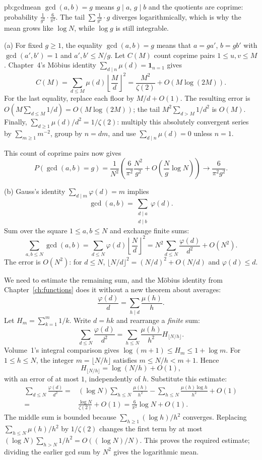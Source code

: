 \begin{solution}{pb:gcdmean}
\idea $\gcd(a,b)=g$ means $g\mid a$, $g\mid b$ and the quotients are coprime: probability $\frac1{g^2}\cdot\frac6{\pi^2}$. The tail
$\sum\frac1{g^2}\cdot g$ diverges logarithmically, which is why the mean grows like $\log N$, while $\log g$ is still integrable.

\writeup (a) For fixed $g\ge1$, the equality $\gcd(a,b)=g$ means that $a=ga'$, $b=gb'$ with $\gcd(a',b')=1$ and $a',b'\le N/g$. Let $C(M)$ count coprime pairs $1\le u,v\le M$. Chapter~4's
M\"obius identity $\sum_{d\mid n}\mu(d)=\mathbf1_{n=1}$ gives
\[
C(M)=\sum_{d\le M}\mu(d)\left\lfloor\frac Md\right\rfloor^2
=\frac{M^2}{\zeta(2)}+O(M\log(2M)).
\]
For the last equality, replace each floor by $M/d+O(1)$.
The resulting error is $O(M\sum_{d\le M}1/d)=O(M\log(2M))$;
the tail $M^2\sum_{d>M}1/d^2$ is $O(M)$.
Finally, $\sum_{d\ge1}\mu(d)/d^2=1/\zeta(2)$: multiply this
absolutely convergent series by $\sum_{m\ge1}m^{-2}$, group by
$n=dm$, and use $\sum_{d\mid n}\mu(d)=0$ unless $n=1$.

This count of coprime pairs now gives
\[
P(\gcd(a,b)=g)
=\frac1{N^2}\left(\frac6{\pi^2}\frac{N^2}{g^2}
+O\left(\frac Ng\log N\right)\right)
\longrightarrow\frac6{\pi^2g^2}.
\]

(b) Gauss's identity $\sum_{d\mid m}\varphi(d)=m$ implies
\[
\gcd(a,b)=\sum_{\substack{d\mid a\\d\mid b}}\varphi(d).
\]
Sum over the square $1\le a,b\le N$ and exchange finite sums:
\[
\sum_{a,b\le N}\gcd(a,b)
=\sum_{d\le N}\varphi(d)\left\lfloor\frac Nd\right\rfloor^2
=N^2\sum_{d\le N}\frac{\varphi(d)}{d^2}+O(N^2).
\]
The error is $O(N^2)$: for $d\le N$,
$\lfloor N/d\rfloor^2=(N/d)^2+O(N/d)$ and $\varphi(d)\le d$.

We need to estimate the remaining sum, and the M\"obius identity
from Chapter~\ref{ch:functions} does it without a new theorem about averages:
\[
\frac{\varphi(d)}d=\sum_{h\mid d}\frac{\mu(h)}h.
\]
Let $H_m=\sum_{k=1}^m1/k$. Write $d=hk$ and rearrange a
\emph{finite} sum:
\[
\sum_{d\le N}\frac{\varphi(d)}{d^2}
=\sum_{h\le N}\frac{\mu(h)}{h^2}
  H_{\lfloor N/h\rfloor}.
\]
Volume~1's integral comparison gives
$\log(m+1)\le H_m\le1+\log m$. For $1\le h\le N$,
the integer $m=\lfloor N/h\rfloor$ satisfies
$m\le N/h<m+1$. Hence
\[
H_{\lfloor N/h\rfloor}=\log(N/h)+O(1),
\]
with an error of at most $1$, independently of $h$.
Substitute this estimate:
\[
\begin{aligned}
\sum_{d\le N}\frac{\varphi(d)}{d^2}
={}&(\log N)\sum_{h\le N}\frac{\mu(h)}{h^2}
-\sum_{h\le N}\frac{\mu(h)\log h}{h^2}+O(1)\\
={}&\frac{\log N}{\zeta(2)}+O(1)
=\frac6{\pi^2}\log N+O(1).
\end{aligned}
\]
The middle sum is bounded because
$\sum_{h\ge1}(\log h)/h^2$ converges. Replacing
$\sum_{h\le N}\mu(h)/h^2$ by $1/\zeta(2)$ changes the
first term by at most
$(\log N)\sum_{h>N}1/h^2=O((\log N)/N)$.
This proves the required estimate; dividing the earlier
gcd sum by $N^2$ gives the logarithmic mean.


\end{solution}
